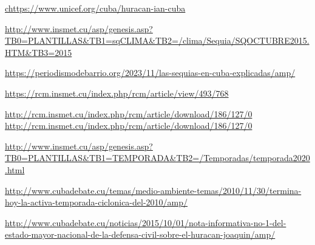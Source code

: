 \documentclass[12pt]{article}
\begin{document}
	
	\newpage
	\begin{thebibliography}{8}
		\url{chttps://www.unicef.org/cuba/huracan-ian-cuba}
		
		\url{http://www.insmet.cu/asp/genesis.asp?TB0=PLANTILLAS&TB1=sqCLIMA&TB2=/clima/Sequia/SQOCTUBRE2015.HTM&TB3=2015}
		
		\url{https://periodismodebarrio.org/2023/11/las-sequias-en-cuba-explicadas/amp/}
		
		\url{https://rcm.insmet.cu/index.php/rcm/article/view/493/768}
		
		\url{http://rcm.insmet.cu/index.php/rcm/article/download/186/127/0
			http://rcm.insmet.cu/index.php/rcm/article/download/186/127/0}
		
		\url{http://www.insmet.cu/asp/genesis.asp?TB0=PLANTILLAS&TB1=TEMPORADA&TB2=/Temporadas/temporada2020.html}
		
		\url{http://www.cubadebate.cu/temas/medio-ambiente-temas/2010/11/30/termina-hoy-la-activa-temporada-ciclonica-del-2010/amp/}
		
		\url{http://www.cubadebate.cu/noticias/2015/10/01/nota-informativa-no-1-del-estado-mayor-nacional-de-la-defensa-civil-sobre-el-huracan-joaquin/amp/}
		
	\end{thebibliography}
	
	
\end{document}
